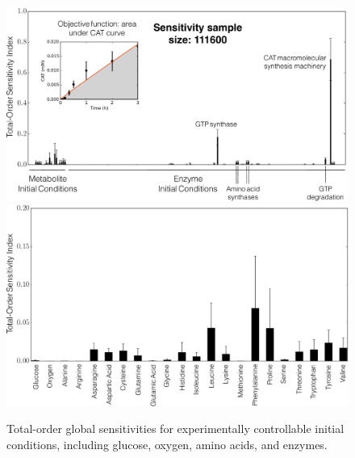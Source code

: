 \documentclass[12pt]{article}
\begin{document}
\begin{figure}[ht]
\centering
\includegraphics[width=1.00\textwidth]{./Figures/Sensitivity.pdf}
\includegraphics[width=1.00\textwidth]{./Figures/Metab_sensitivity.pdf}
\caption{Total-order global sensitivities for experimentally controllable initial conditions, including glucose, oxygen, amino acids, and enzymes.}
\label{fig:GlobalSensitivity}
\end{figure}

\clearpage

\renewcommand\thefigure{S\arabic{figure}}
\renewcommand\thetable{T\arabic{table}}
\renewcommand\thepage{S-\arabic{page}}
\renewcommand\theequation{S\arabic{equation}}

\setcounter{equation}{0}
\setcounter{table}{0}
\setcounter{figure}{0}
\setcounter{page}{1}


\end{document}
